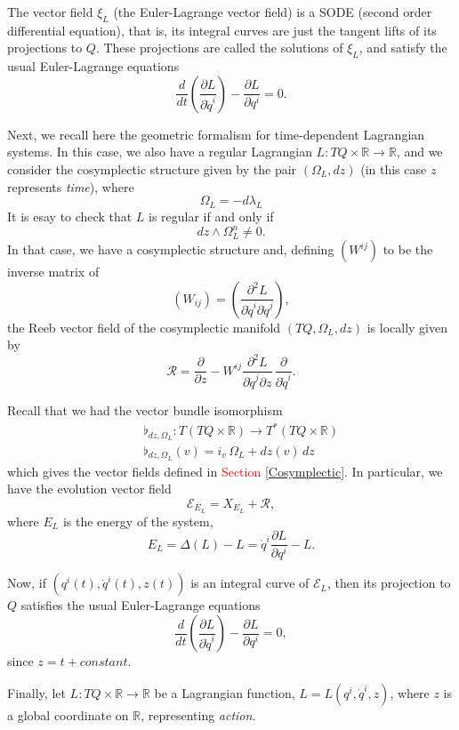 \documentclass[12pt]{article}
\newcommand{\partder}[2]{\frac{\partial #1}{\partial #2}}
\begin{document}
The vector field $\xi_L$ (the Euler-Lagrange vector field) is a SODE (second order differential equation), that is, its integral curves are just the tangent lifts of its projections to $Q$. These projections are called the solutions of $\xi_L$, and satisfy the usual Euler-Lagrange equations
\begin{equation}
\frac{d}{dt} \left(\frac{\partial L}{\partial \dot{q}^i}\right) - \frac{\partial L}{\partial q^i} = 0.
\end{equation}

Next, we  recall here the geometric formalism for time-dependent Lagrangian systems.
In this case, we also have a regular Lagrangian $L : TQ \times \mathbb R \longrightarrow \mathbb R$,
and we consider the cosymplectic structure given by the pair
$(\Omega_L, dz)$ (in this case $z$ represents \textit{time}), where
$$
\Omega_L = - d \lambda_L
$$
It is esay to check that $L$ is regular if and only if
$$
dz \wedge \Omega_L^n \not= 0.
$$
In that case, we have a cosymplectic structure and, defining $(W^{ij})$ to be the inverse matrix of $$(W_{ij}) = \left( \frac{\partial^2 L}{\partial \dot{q}^i \partial \dot{q}^j} \right),$$ the Reeb vector field of the cosymplectic manifold $(TQ, \Omega_L, dz)$ is locally given by
$$
\mathcal R = \frac{\partial}{\partial z} - W^{ij} \frac{\partial^2 L}{\partial \dot{q}^j \partial z} \, \frac{\partial}{\partial \dot{q}^i}.
$$

Recall that we had the vector bundle isomorphism
\begin{eqnarray*}
&&{\flat}_{dz, \Omega_L}  :  T(TQ \times \mathbb R) \longrightarrow T^*(TQ \times \mathbb R)\\
&&{\flat}_{dz, \Omega_L} (v) = i_v \, \Omega_L + dz (v) \, dz
\end{eqnarray*}
which gives the vector fields defined in \textcolor{red}{Section \ref{Cosymplectic}}. In particular, we have the evolution vector field $$\mathcal{E}_{E_L} = X_{E_L} + \mathcal{R},$$ where $E_L$ is the energy of the system, $$E_L = \Delta(L) - L = \dot{q}^i \partder{L}{q^i} - L.$$

Now, if $(q^i(t), \dot{q}^i(t), z(t))$ is an integral curve of ${\mathcal E}_L$, then its projection to $Q$ satisfies the usual Euler-Lagrange equations
\begin{equation}\label{cosylagr3}
\frac{d}{dt} \left(\frac{\partial L}{\partial \dot{q}^i}\right) - \frac{\partial L}{\partial q^i} = 0,
\end{equation}
since $z = t + constant$. 

Finally, let $L : TQ \times \mathbb R \longrightarrow \mathbb R$ be a Lagrangian function, $L = L(q^i, \dot{q}^i, z)$, where $z$ is a global coordinate on $\mathbb{R}$, representing \textit{action}.
\end{document}
